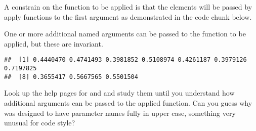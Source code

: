 \documentclass[krantz2]{krantz}\usepackage{knitr}%
\begin{document}
A constrain on the function to be applied is that the elements will be passed by apply functions to the first argument as demonstrated in the code chunk below.

\begin{knitrout}\footnotesize
{}\color{fgcolor}\begin{kframe}
\begin{alltt}
 \hlkwb{<-} \hlstd{(} \hlstd{=} \hlstd{,} \hlstd{) \{}
\hlstd{\}}
  \hlstd{=} \hlstd{,}   
\end{alltt}
\end{kframe}
\end{knitrout}

One or more additional named arguments can be passed to the function to be applied, but these are invariant.

\begin{knitrout}\footnotesize
{}\color{fgcolor}\begin{kframe}
\begin{alltt}
  \hlstd{=} \hlstd{,}    \hlstd{=} \hlstd{)}
\end{alltt}
\begin{verbatim}
##  [1] 0.4440470 0.4741493 0.3981852 0.5108974 0.4261187 0.3979126 0.7197825
##  [8] 0.3655417 0.5667565 0.5501504
\end{verbatim}
\end{kframe}
\end{knitrout}

\begin{playground}
Look up the help pages for  and  and study them until you understand how additional arguments can be passed to the applied function. Can you guess why  was designed to have parameter names fully in upper case, something very unusual for \Rlang code style?
\end{playground}
\end{document}
